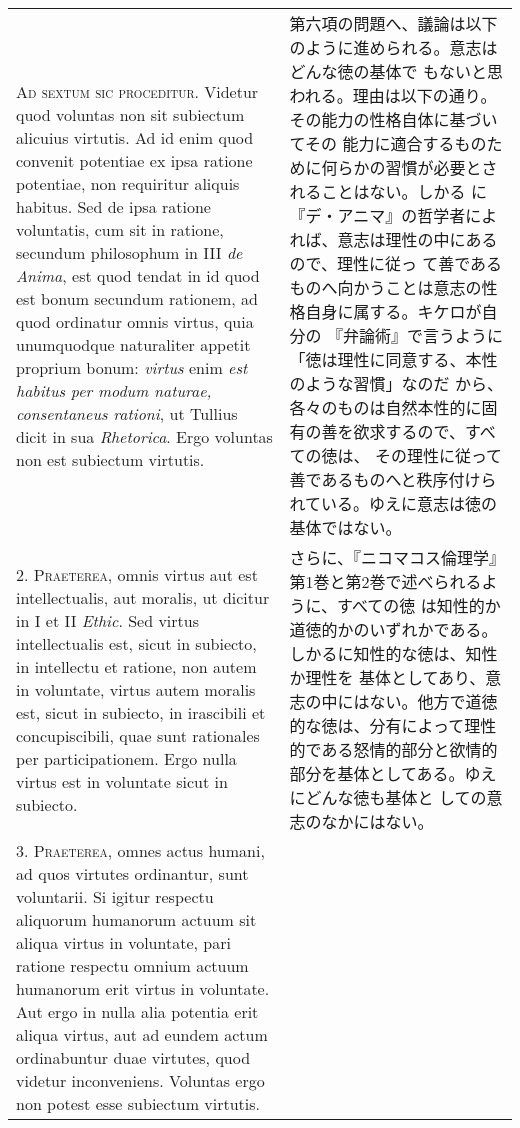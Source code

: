 \documentclass[10pt]{jsarticle}
\begin{document}
\begin{longtable}{p{21em}p{21em}}

{\scshape Ad sextum sic proceditur}. Videtur quod voluntas non sit
subiectum alicuius virtutis. Ad id enim quod convenit potentiae ex
ipsa ratione potentiae, non requiritur aliquis habitus. Sed de ipsa
ratione voluntatis, cum sit in ratione, secundum philosophum in III
{\itshape de Anima}, est quod tendat in id quod est bonum secundum
rationem, ad quod ordinatur omnis virtus, quia unumquodque naturaliter
appetit proprium bonum: {\itshape virtus} enim {\itshape est habitus
per modum naturae, consentaneus rationi}, ut Tullius dicit in sua
{\itshape Rhetorica}. Ergo voluntas non est subiectum virtutis.

&

 第六項の問題へ、議論は以下のように進められる。意志はどんな徳の基体で
 もないと思われる。理由は以下の通り。その能力の性格自体に基づいてその
 能力に適合するものために何らかの習慣が必要とされることはない。しかる
 に『デ・アニマ』の哲学者によれば、意志は理性の中にあるので、理性に従っ
 て善であるものへ向かうことは意志の性格自身に属する。キケロが自分の
 『弁論術』で言うように「徳は理性に同意する、本性のような習慣」なのだ
 から、各々のものは自然本性的に固有の善を欲求するので、すべての徳は、
 その理性に従って善であるものへと秩序付けられている。ゆえに意志は徳の
 基体ではない。
 
\\

2. {\scshape Praeterea}, omnis virtus aut est intellectualis, aut
moralis, ut dicitur in I et II {\itshape Ethic}. Sed virtus
intellectualis est, sicut in subiecto, in intellectu et ratione, non
autem in voluntate, virtus autem moralis est, sicut in subiecto, in
irascibili et concupiscibili, quae sunt rationales per
participationem. Ergo nulla virtus est in voluntate sicut in subiecto.

&

さらに、『ニコマコス倫理学』第1巻と第2巻で述べられるように、すべての徳
は知性的か道徳的かのいずれかである。しかるに知性的な徳は、知性か理性を
基体としてあり、意志の中にはない。他方で道徳的な徳は、分有によって理性
的である怒情的部分と欲情的部分を基体としてある。ゆえにどんな徳も基体と
しての意志のなかにはない。
 
\\

3. {\scshape Praeterea}, omnes actus humani, ad quos virtutes
ordinantur, sunt voluntarii. Si igitur respectu aliquorum humanorum
actuum sit aliqua virtus in voluntate, pari ratione respectu omnium
actuum humanorum erit virtus in voluntate. Aut ergo in nulla alia
potentia erit aliqua virtus, aut ad eundem actum ordinabuntur duae
virtutes, quod videtur inconveniens. Voluntas ergo non potest esse
subiectum virtutis.


\end{longtable}
\end{document}
